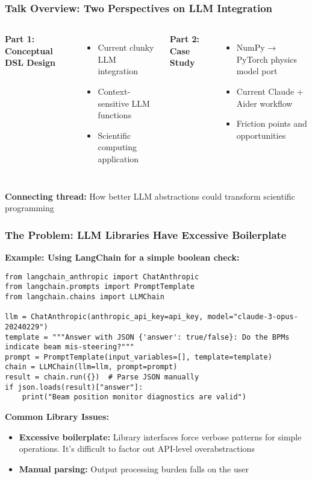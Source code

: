 \documentclass{beamer}
\title{}
\subtitle{}
\author{}
\date{\today}
\begin{document}
\begin{frame}
\titlepage
\end{frame}

\begin{frame}
\frametitle{Talk Overview: Two Perspectives on LLM Integration}

\begin{columns}
\textbf{Part 1: Conceptual DSL Design}
\begin{itemize}
\item Current clunky LLM integration
\item Context-sensitive LLM functions
\item Scientific computing application
\end{itemize}

\textbf{Part 2: Case Study}
\begin{itemize}
\item NumPy → PyTorch physics model port
\item Current Claude + Aider workflow
\item Friction points and opportunities
\end{itemize}
\end{columns}

\vspace{0.5cm}
\centering
\textbf{Connecting thread:} How better LLM abstractions could transform scientific programming
\end{frame}

\begin{frame}[fragile]
\frametitle{The Problem: LLM Libraries Have Excessive Boilerplate}

\textbf{Example: Using LangChain for a simple boolean check:}
\begin{lstlisting}[basicstyle=\ttfamily\scriptsize]
from langchain_anthropic import ChatAnthropic
from langchain.prompts import PromptTemplate
from langchain.chains import LLMChain

llm = ChatAnthropic(anthropic_api_key=api_key, model="claude-3-opus-20240229")
template = """Answer with JSON {'answer': true/false}: Do the BPMs indicate beam mis-steering?"""
prompt = PromptTemplate(input_variables=[], template=template)
chain = LLMChain(llm=llm, prompt=prompt)
result = chain.run({})  # Parse JSON manually
if json.loads(result)["answer"]:
    print("Beam position monitor diagnostics are valid")
\end{lstlisting}

\textbf{Common Library Issues:}
\begin{itemize}
\item \textbf{Excessive boilerplate:} Library interfaces force verbose patterns for simple operations. It's difficult to factor out API-level overabstractions
\item \textbf{Manual parsing:} Output processing burden falls on the user
\end{itemize}
\end{frame}
\end{document}
